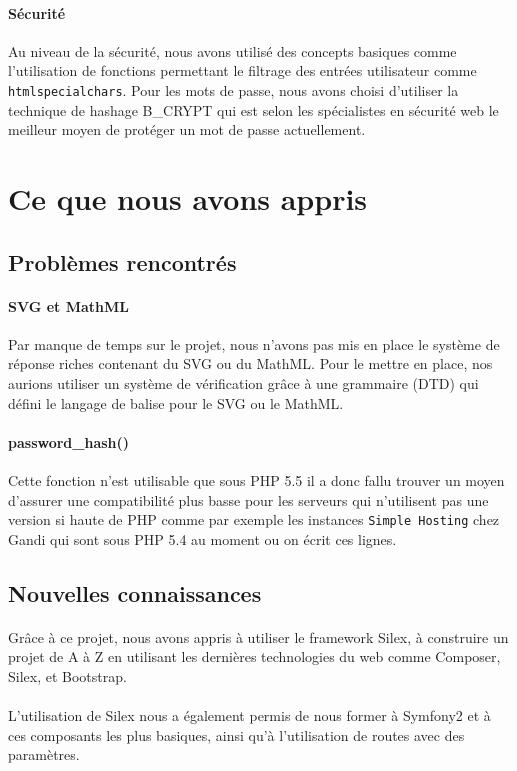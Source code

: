 \documentclass[12pt]{article}
\begin{document}
    \paragraph{Sécurité} Au niveau de la sécurité, nous avons utilisé des concepts basiques comme l'utilisation de fonctions permettant le filtrage des entrées utilisateur comme \texttt{htmlspecialchars}. Pour les mots de passe, nous avons choisi d'utiliser la technique de hashage B\_CRYPT qui est selon les spécialistes en sécurité web le meilleur moyen de protéger un mot de passe actuellement.

\section{Ce que nous avons appris}
    \subsection{Problèmes rencontrés}
        \paragraph{SVG et MathML}Par manque de temps sur le projet, nous n'avons pas mis en place le système de réponse riches contenant du SVG ou du MathML. Pour le mettre en place, nos aurions utiliser un système de vérification grâce à une grammaire (DTD) qui défini le langage de balise pour le SVG ou le MathML.
        \paragraph{password\_hash()}Cette fonction n'est utilisable que sous PHP 5.5 il a donc fallu trouver un moyen d'assurer une compatibilité plus basse pour les serveurs qui n'utilisent pas une version si haute de PHP comme par exemple les instances \texttt{Simple Hosting} chez Gandi qui sont sous PHP 5.4 au moment ou on écrit ces lignes.
        
    \subsection{Nouvelles connaissances}
        \paragraph{}Grâce à ce projet, nous avons appris à utiliser le framework Silex, à construire un projet de A à Z en utilisant les dernières technologies du web comme Composer, Silex, et Bootstrap. 
        \paragraph{}L'utilisation de Silex nous a également permis de nous former à Symfony2 et à ces composants les plus basiques, ainsi qu'à l'utilisation de routes avec des paramètres.
    
\end{document}
